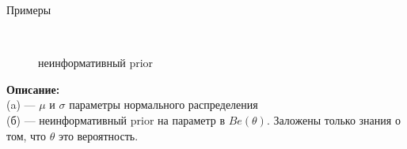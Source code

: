 \documentclass[10pt]{beamer}
\begin{document}
\begin{frame}{Примеры}
\begin{figure}[h!t]\center
{}
\\
\caption{неинформативный prior}
\end{figure}
{\bf Описание:}\\
\quad
	(a) --- $\mu$ и $\sigma$ параметры нормального распределения\\
\quad
	(б) --- неинформативный prior на параметр в $Be(\theta)$. Заложены только знания о том, что $\theta$ это вероятность.\\
	~\\
\end{frame}
\end{document}
